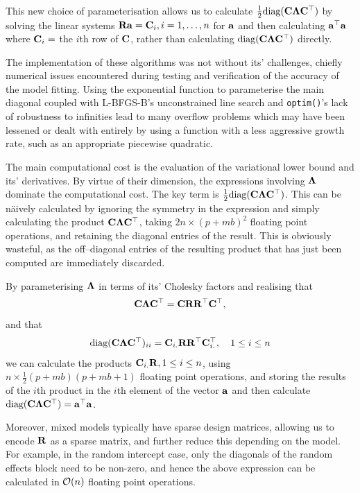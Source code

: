 \noindent This new choice of parameterisation allows us to calculate
$\frac{1}{2} \text{diag}({\bf C} {\boldsymbol \Lambda} {\bf C}^\top)$ by solving the linear systems
${\bf R} {\bf a} = {\bf C}_{i}, i=1, \ldots, n$ for   ${\bf a}$ and then calculating
${\bf a}^\top{\bf a}$ where ${\bf C}_{i} = $ the $i$th row of ${\bf C}$, rather than
calculating $\text{diag}({\bf C} {\boldsymbol \Lambda} {\bf C}^\top)$ directly.
	
The implementation of these algorithms was not without its' challenges, chiefly numerical issues encountered during testing and verification of the accuracy of the model fitting. Using the exponential function to parameterise the main diagonal coupled with L-BFGS-B's unconstrained line search and \texttt{optim()}'s lack of robustness to infinities lead to many overflow problems which may have been lessened or dealt with entirely by using a function with a less aggressive growth rate, such as an appropriate piecewise quadratic.
	
The main computational cost is the evaluation of the variational lower bound
and its' derivatives. By virtue of their dimension, the expressions involving
${\boldsymbol \Lambda}$ dominate the computational cost. The key term is $\frac{1}{2}
\text{diag}({\bf C} {\boldsymbol \Lambda} {\bf C}^\top)$. This can be n\"aively calculated by ignoring the
symmetry in the expression and simply calculating the product ${\bf C} {\boldsymbol \Lambda}
{\bf C}^\top$, taking $2 n \times (p + m b)^2$ floating point operations, and
retaining the diagonal entries of the result. This is obviously wasteful, as
the off--diagonal entries of the resulting product that has just been computed
are immediately discarded.
	
By parameterising ${\boldsymbol \Lambda}$ in terms of its' Cholesky factors and realising that
\begin{equation*}
	{\bf C} {\boldsymbol\Lambda} {\bf C}^\top = {\bf C} {\bf R} {\bf R}^\top {\bf C}^\top,
\end{equation*}
\noindent and that
\begin{equation*}
	\text{diag}({\bf C} {\boldsymbol \Lambda} {\bf C}^\top)_{ii} = {\bf C}_{i .} {\bf R} {\bf R}^\top {\bf C}_{i .}^\top,\quad1 \leq i \leq n
\end{equation*}
\noindent we can calculate the products ${\bf C}_{i .} {\bf R}, 1 \leq i \leq n$, using $n \times \frac{1}{2}(p + m
b)(p + m b   + 1)$ floating point operations, and storing the results of the $i$th product in the $i$th
element of the   vector ${\bf a}$ and then calculate $\text{diag}({\bf C} {\boldsymbol \Lambda} {\bf C}^\top) = {\bf a}^\top {\bf a}$.
	
Moreover, mixed models typically have sparse design matrices, allowing us to encode ${\bf R}$ as a sparse matrix, and	further reduce   this depending on the model. For example, in the random intercept case, only the diagonals of the random effects block need to be non-zero, and hence the above expression can be calculated in
$\mathcal{O}(n)$ floating point operations.
	
